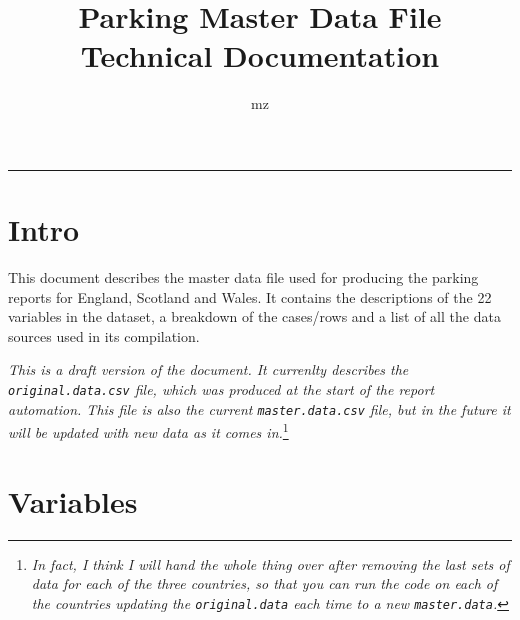 \documentclass[]{article}
\title{Parking Master Data File Technical Documentation}
\author{mz}
\date{}
\let\rmarkdownfootnote\footnote%
\def\footnote{\protect\rmarkdownfootnote}
\begin{document}
\maketitle

{
\setcounter{tocdepth}{2}
\tableofcontents
}
\begin{center}\rule{0.5\linewidth}{\linethickness}\end{center}

\hypertarget{intro}{%
\section*{Intro}\label{intro}}

This document describes the master data file used for producing the parking reports for England, Scotland and Wales. It contains the descriptions of the 22 variables in the dataset, a breakdown of the cases/rows and a list of all the data sources used in its compilation.

\emph{This is a draft version of the document. It currenlty describes the \texttt{original.data.csv} file, which was produced at the start of the report automation. This file is also the current \texttt{master.data.csv} file, but in the future it will be updated with new data as it comes in.}\footnote{\emph{In fact, I think I will hand the whole thing over after removing the last sets of data for each of the three countries, so that you can run the code on each of the countries updating the \texttt{original.data} each time to a new \texttt{master.data}.}}

\hypertarget{variables}{%
\section{Variables}\label{variables}}
\end{document}
